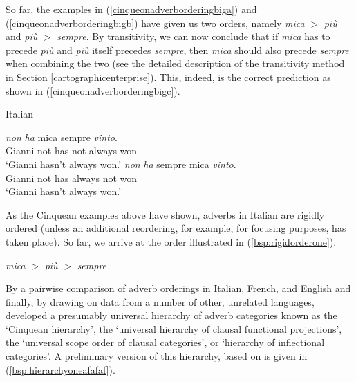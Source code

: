 \noindent So far, the examples in (\ref{cinqueonadverborderingbiga}) and (\ref{cinqueonadverborderingbigb}) have given us two orders, namely \textit{mica} $>$ \textit{più} and \textit{più} $>$ \textit{sempre}. By transitivity, we can now conclude that if \textit{mica} has to precede \textit{più} and \textit{più} itself precedes \textit{sempre}, then \textit{mica} should also precede \textit{sempre} when combining the two (see the detailed description of the transitivity method in Section \ref{cartographicenterprise}). This, indeed, is the correct prediction as shown in (\ref{cinqueonadverborderingbigc}).

\begin{exe} 
\ex Italian \citep[6]{cinque1999adverbs}\label{cinqueonadverborderingbigc} \begin{xlist} 
\ex {} {\textit{non}} {\textit{ha}} {mica} {sempre} {\textit{vinto}.}  \\
{Gianni} {not} {has} {not} {always} {won} \\
\trans `Gianni hasn't always won.' \label{cinqueonadverborderingca}
\ex \gll {} {\textit{non}} {\textit{ha}} {sempre} {mica} {\textit{vinto}.}  \\
{Gianni} {not} {has} {always} {not} {won} \\
\trans `Gianni hasn't always won.'  \label{cinqueonadverborderingcb}
\end{xlist} 
\end{exe}

\noindent As the Cinquean examples above have shown, adverbs in Italian are rigidly ordered (unless an additional reordering, for example, for focusing purposes, has taken place). So far, we arrive at the order illustrated in (\ref{bsp:rigidorderone}).


\begin{exe}
\ex\label{bsp:rigidorderone} 
\textit{mica} $>$ \textit{più} $>$ \textit{sempre}
\end{exe}

\noindent By a pairwise comparison of adverb orderings in Italian, French, and English and finally, by drawing on data from a number of other, unrelated languages, \citet{cinque1999adverbs} developed a presumably universal hierarchy of adverb categories known as the `Cinquean hierarchy', the `universal hierarchy of clausal functional projections', the `universal scope order of clausal categories', or `hierarchy of inflectional categories'. A preliminary version of this hierarchy, based on \citet[106]{cinque1999adverbs} is given in (\ref{bsp:hierarchyoneafafaf}).

